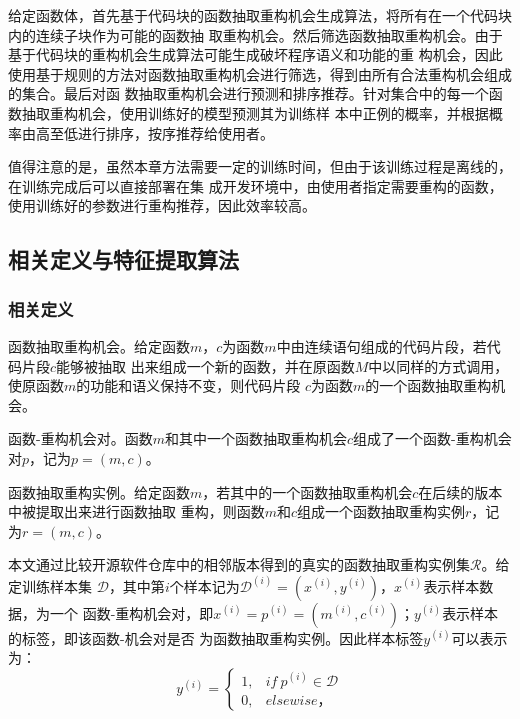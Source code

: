 给定函数体，首先基于代码块的函数抽取重构机会生成算法，将所有在一个代码块内的连续子块作为可能的函数抽
取重构机会。然后筛选函数抽取重构机会。由于基于代码块的重构机会生成算法可能生成破坏程序语义和功能的重
构机会，因此使用基于规则的方法对函数抽取重构机会进行筛选，得到由所有合法重构机会组成的集合。最后对函
数抽取重构机会进行预测和排序推荐。针对集合中的每一个函数抽取重构机会，使用训练好的模型预测其为训练样
本中正例的概率，并根据概率由高至低进行排序，按序推荐给使用者。

值得注意的是，虽然本章方法需要一定的训练时间，但由于该训练过程是离线的，在训练完成后可以直接部署在集
成开发环境中，由使用者指定需要重构的函数，使用训练好的参数进行重构推荐，因此效率较高。

\subsection{相关定义与特征提取算法}
\subsubsection{相关定义}

\begin{Definition}
  函数抽取重构机会。给定函数$m$，$c$为函数$m$中由连续语句组成的代码片段，若代码片段$c$能够被抽取
  出来组成一个新的函数，并在原函数$M$中以同样的方式调用，使原函数$m$的功能和语义保持不变，则代码片段
  $c$为函数$m$的一个函数抽取重构机会。
\end{Definition}

\begin{Definition}
  函数-重构机会对。函数$m$和其中一个函数抽取重构机会$c$组成了一个函数-重构机会对$p$，记为$p=(m,c)$。
\end{Definition}

\begin{Definition}
  函数抽取重构实例。给定函数$m$，若其中的一个函数抽取重构机会$c$在后续的版本中被提取出来进行函数抽取
  重构，则函数$m$和$c$组成一个函数抽取重构实例$r$，记为$r=(m,c)$。
\end{Definition}

本文通过比较开源软件仓库中的相邻版本得到的真实的函数抽取重构实例集$\mathcal R$。给定训练样本集
$\mathcal D$，其中第$i$个样本记为$\mathcal D^{(i)}=(x^{(i)},y^{(i)})$，$x^{(i)}$表示样本数据，为一个
函数-重构机会对，即$x^{(i)}=p^{(i)}=(m^{(i)},c^{(i)})$；$y^{(i)}$表示样本的标签，即该函数-机会对是否
为函数抽取重构实例。因此样本标签$y^{(i)}$可以表示为：
\begin{equation}
   y^{(i)} = 
       \begin{cases}
             1, & \textit{if}~p^{(i)}\in \mathcal D\\ 
  0, & elsewise，  
       \end{cases}
\end{equation}

